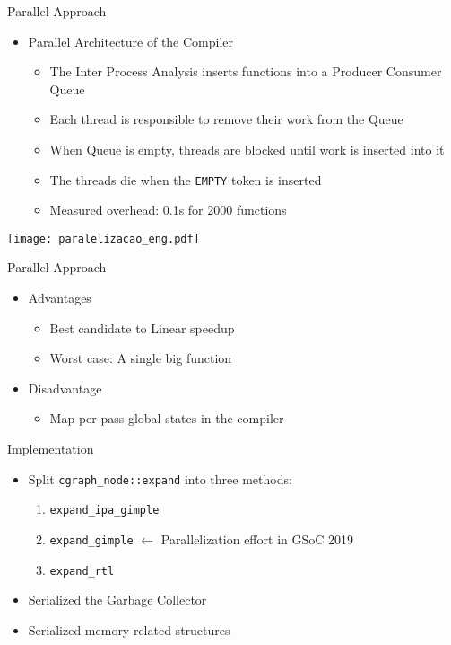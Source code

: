 \begin{frame}{Parallel Approach}
    \begin{itemize}
        \item Parallel Architecture of the Compiler
            \begin{itemize}
                \item The Inter Process Analysis inserts functions into a Producer Consumer Queue
                \item Each thread is responsible to remove their work from the Queue
                \item When Queue is empty, threads are blocked until work is inserted into it
                \item The threads die when the \texttt{EMPTY} token is inserted
                \item Measured overhead: 0.1s for 2000 functions
             \end{itemize}
\end{itemize}
 \centering
 \texttt{[image: paralelizacao\_eng.pdf]}
\end{frame}

\begin{frame}{Parallel Approach}
    \begin{itemize}
        \item Advantages
            \begin{itemize}
                \item Best candidate to Linear speedup
                \item Worst case: A single big function
            \end{itemize}
        \item Disadvantage
            \begin{itemize}
              \item Map per-pass global states in the compiler
            \end{itemize}
    \end{itemize}
\end{frame}

\begin{frame}{Implementation}
    \begin{itemize}
        \item Split \texttt{cgraph\_node::expand} into three methods:
            \begin{enumerate}
                \item \texttt{expand\_ipa\_gimple}
                \item \texttt{expand\_gimple} $\longleftarrow$ Parallelization effort in GSoC 2019
                \item \texttt{expand\_rtl}
            \end{enumerate}
        \item Serialized the Garbage Collector
        \item Serialized memory related structures
    \end{itemize}
\end{frame}

